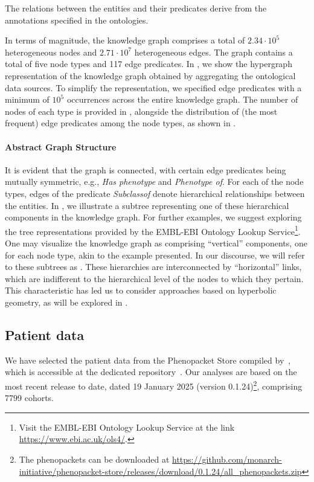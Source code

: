 The relations between the entities and their predicates derive from the annotations specified in the ontologies.




In terms of magnitude, the knowledge graph comprises a total of $2.34\cdot10^5$ heterogeneous nodes and $2.71\cdot10^7$ heterogeneous edges. The graph contains a total of five node types and 117 edge predicates. In , we show the hypergraph representation of the knowledge graph obtained by aggregating the ontological data sources. To simplify the representation, we specified edge predicates with a minimum of $10^5$ occurrences across the entire knowledge graph. The number of nodes of each type is provided in , alongside the distribution of (the most frequent) edge predicates among the node types, as shown in .

\paragraph{Abstract Graph Structure}\label{sec:abstractGraphStructure}
It is evident that the graph is connected, with certain edge predicates being mutually symmetric, e.g., \emph{Has phenotype} and \emph{Phenotype of}. For each of the node types, edges of the predicate \emph{Subclassof} denote hierarchical relationships between the entities. In , we illustrate a subtree representing one of these hierarchical components in the knowledge graph. For further examples, we suggest exploring the tree representations provided by the EMBL-EBI Ontology Lookup Service\footnote{Visit the EMBL-EBI Ontology Lookup Service at the link \url{https://www.ebi.ac.uk/ols4/}.}. One may visualize the knowledge graph as comprising ``vertical'' components, one for each node type, akin to the example presented. In our discourse, we will refer to these subtrees as . These hierarchies are interconnected by ``horizontal'' links, which are indifferent to the hierarchical level of the nodes to which they pertain. This characteristic has led us to consider approaches based on hyperbolic geometry, as will be explored in .

\subsection{Patient data}
We have selected the patient data from the Phenopacket Store compiled by~\cite{Danis2025Phenopackets}, which is accessible at the dedicated repository~\cite{Robinson2024PhenopacketStore}. Our analyses are based on the most recent release to date, dated 19 January 2025 (version 0.1.24)\footnote{The phenopackets can be downloaded at \url{https://github.com/monarch-initiative/phenopacket-store/releases/download/0.1.24/all_phenopackets.zip}}, comprising 7799 cohorts.

